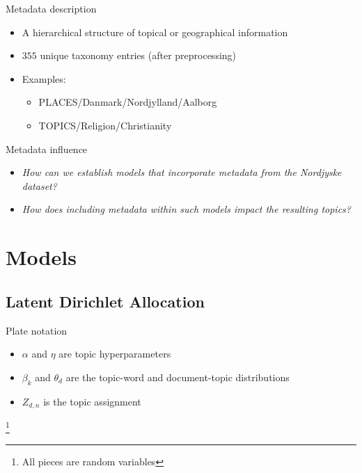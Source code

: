 \begin{frame}{\insertsubsection}{Metadata description}
	\begin{itemize}
		\item A hierarchical structure of topical or geographical information 
		\item $355$ unique taxonomy entries (after preprocessing)
		\item Examples: 
		\begin{itemize}
			\item PLACES/Danmark/Nordjylland/Aalborg
			\item TOPICS/Religion/Christianity
		\end{itemize}
	\end{itemize}
\end{frame}

\begin{frame}{\insertsection}{Metadata influence}
	\begin{itemize}
		\item \textit{How can we establish models that incorporate metadata from the Nordjyske dataset?}
		\item \textit{How does including metadata within such models impact the resulting topics?}
	\end{itemize}
\end{frame}

\section{Models}

\subsection{Latent Dirichlet Allocation}

\begin{frame}{\insertsubsection}{Plate notation}
	\begin{figure}
		\centering
		\resizebox{\textwidth}{!}{%
			
		}
	\end{figure}
	\begin{itemize}
		\item $\alpha$ and $\eta$ are topic hyperparameters
		\item $\beta_k$ and $\theta_d$ are the topic-word and document-topic distributions
		\item $Z_{d,n}$ is the topic assignment 
	\end{itemize}
	\let\thefootnote\relax\footnote{\tiny{All pieces are random variables}}
\end{frame}


